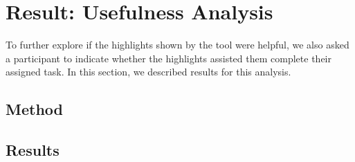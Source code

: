
\section{Result: Usefulness Analysis}
\label{cp6:usefulness}






To further explore if the highlights shown by the tool were helpful, we also asked a participant 
to indicate whether the highlights assisted them complete their assigned task. 
In this section, we described results for this analysis. 



\subsection{Method}



\subsection{Results}








        







 


